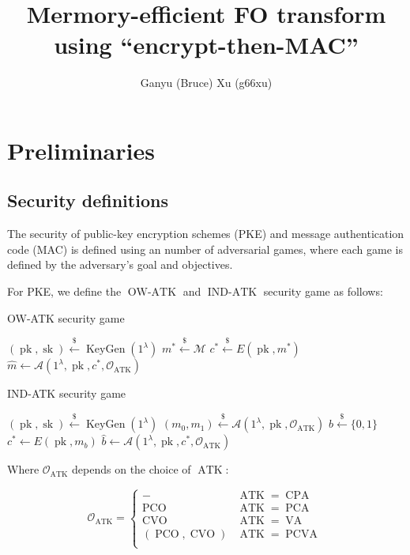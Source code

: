 \documentclass{article}
\title{Mermory-efficient FO transform using ``encrypt-then-MAC''}
\author{Ganyu (Bruce) Xu (g66xu)}
\newcommand{\leftsample}{\overset{{\scriptscriptstyle\$}}{\leftarrow}}
\newcommand{\keygen}{\operatorname{KeyGen}}
\newcommand{\pk}{\operatorname{pk}}
\newcommand{\sk}{\operatorname{sk}}
\newcommand{\pco}{\operatorname{PCO}}
\newcommand{\cvo}{\operatorname{CVO}}
\newcommand{\llbrack}{[\![}
\newcommand{\rrbrack}{]\!]}
\begin{document}
\maketitle

\section{Preliminaries}
\subsection{Security definitions}
The security of public-key encryption schemes (PKE) and message authentication code (MAC) is defined using an number of adversarial games, where each game is defined by the adversary's goal and objectives.

For PKE, we define the $\operatorname{OW-ATK}$ and $\operatorname{IND-ATK}$ security game as follows:

\begin{multicols}{2}
    \begin{algorithm}[H]
        \caption{OW-ATK security game}
        \SetAlgoLined
        $(\pk, \sk) \leftsample \keygen(1^\lambda)$\;
        $m^\ast \leftsample \mathcal{M}$\;
        $c^\ast \leftsample E(\pk, m^\ast)$\;
        $\hat{m} \leftarrow \mathcal{A}(1^\lambda, \pk, c^\ast, \mathcal{O}_{\operatorname{ATK}})$\;
        \Return{
            $\llbrack m = \hat{m} \rrbrack$
        }
    \end{algorithm}

    \begin{algorithm}[H]
        \caption{IND-ATK security game}
        \SetAlgoLined
        $(\pk, \sk) \leftsample \keygen(1^\lambda)$\;
        $(m_0, m_1) \leftsample \mathcal{A}(1^\lambda, \pk, \mathcal{O}_{\operatorname{ATK}})$\;
        $b \leftsample \{0, 1\}$\;
        $c^\ast \leftarrow E(\pk, m_b)$\;
        $\hat{b} \leftarrow \mathcal{A}(1^\lambda, \pk, c^\ast, \mathcal{O}_{\operatorname{ATK}})$\;
        \Return{
            $\llbrack \hat{b} = b \rrbrack$
        }
    \end{algorithm}
\end{multicols}

Where $\mathcal{O}_{\operatorname{ATK}}$ depends on the choice of $\operatorname{ATK}$:

\begin{equation*}
    \mathcal{O}_{\operatorname{ATK}} =\begin{cases}
        - & \operatorname{ATK} = \operatorname{CPA} \\
        \pco & \operatorname{ATK} = \operatorname{PCA} \\
        \cvo & \operatorname{ATK} = \operatorname{VA} \\
        (\pco, \cvo) & \operatorname{ATK} = \operatorname{PCVA} \\
    \end{cases}
\end{equation*}
\end{document}
